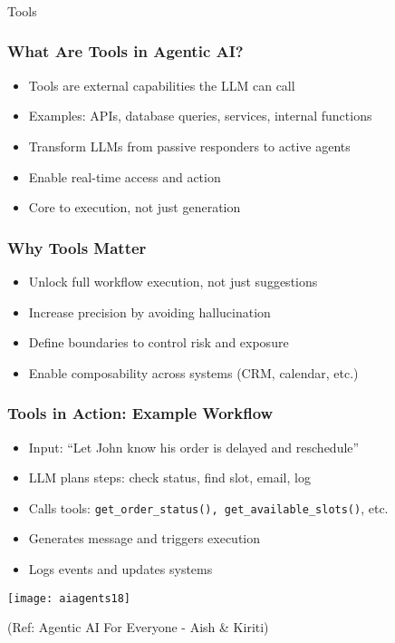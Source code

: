 \begin{frame}[fragile]\frametitle{}
\begin{center}
{\Large Tools}
\end{center}
\end{frame}

\begin{frame}[fragile]\frametitle{What Are Tools in Agentic AI?}
      \begin{itemize}
        \item Tools are external capabilities the LLM can call
        \item Examples: APIs, database queries, services, internal functions
        \item Transform LLMs from passive responders to active agents
        \item Enable real-time access and action
        \item Core to execution, not just generation
      \end{itemize}
\end{frame}

\begin{frame}[fragile]\frametitle{Why Tools Matter}
      \begin{itemize}
        \item Unlock full workflow execution, not just suggestions
        \item Increase precision by avoiding hallucination
        \item Define boundaries to control risk and exposure
        \item Enable composability across systems (CRM, calendar, etc.)
      \end{itemize}
\end{frame}

\begin{frame}[fragile]\frametitle{Tools in Action: Example Workflow}
      \begin{itemize}
        \item Input: ``Let John know his order is delayed and reschedule''
        \item LLM plans steps: check status, find slot, email, log
        \item Calls tools: \lstinline|get_order_status(), get_available_slots()|, etc.
        \item Generates message and triggers execution
        \item Logs events and updates systems
      \end{itemize}
	  
		\begin{center}
		\texttt{[image: aiagents18]}
		
		{\tiny (Ref: Agentic AI For Everyone - Aish \& Kiriti)}
		\end{center}	  
\end{frame}

